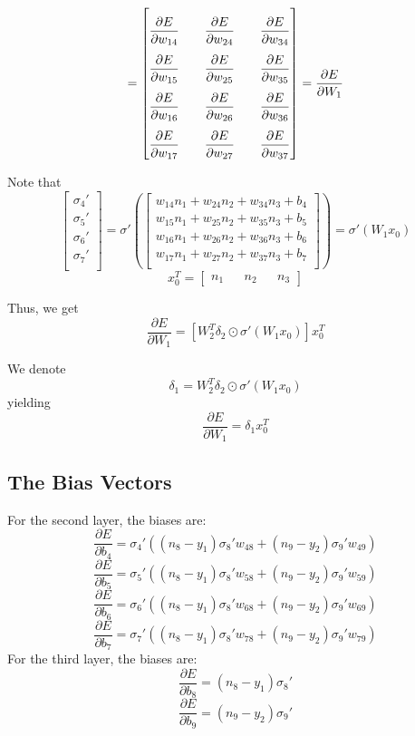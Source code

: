\documentclass{article}
\begin{document}
\[
=
\renewcommand{\arraystretch}{2.5}
\begin{bmatrix}
    \dfrac{\partial E}{\partial w_{14}} && \dfrac{\partial E}{\partial w_{24}}  && \dfrac{\partial E}{\partial w_{34}}  \\
    \dfrac{\partial E}{\partial w_{15}} && \dfrac{\partial E}{\partial w_{25}}  && \dfrac{\partial E}{\partial w_{35}}  \\
    \dfrac{\partial E}{\partial w_{16}} && \dfrac{\partial E}{\partial w_{26}}  && \dfrac{\partial E}{\partial w_{36}}  \\
    \dfrac{\partial E}{\partial w_{17}} && \dfrac{\partial E}{\partial w_{27}}  && \dfrac{\partial E}{\partial w_{37}}  \\
\end{bmatrix}
\renewcommand{\arraystretch}{1}
=
\dfrac{\partial E}{\partial W_1}
\]

Note that
\[
\begin{bmatrix}
    \sigma_4' \\
    \sigma_5' \\
    \sigma_6' \\
    \sigma_7' \\
\end{bmatrix}
 =
 \sigma'\left(
 \begin{bmatrix}
     w_{14}n_1 + w_{24}n_2 + w_{34}n_3 + b_4 \\
     w_{15}n_1 + w_{25}n_2 + w_{35}n_3 + b_5 \\
     w_{16}n_1 + w_{26}n_2 + w_{36}n_3 + b_6 \\
     w_{17}n_1 + w_{27}n_2 + w_{37}n_3 + b_7 \\
 \end{bmatrix}
 \right)
 =
 \sigma'(W_1x_0)
 \]
 \[ x_0^T = \begin{bmatrix}
    n_1 && n_2 && n_3
\end{bmatrix}
\]

Thus, we get
\[
\dfrac{\partial E}{\partial W_1} =
[W_2^T\delta_2 \odot \sigma'(W_1x_0)]x_0^T
\]

We denote
\[\delta_1 = W_2^T\delta_2 \odot \sigma'(W_1x_0)\]
yielding
\[\dfrac{\partial E}{\partial W_1} = \delta_1x_0^T\]


\subsection{The Bias Vectors}
For the second layer, the biases are:
\[\dfrac{\partial E}{\partial b_4} = \sigma_4'((n_8-y_1)\sigma_8'w_{48} + (n_9-y_2)\sigma_9'w_{49})\]
\[\dfrac{\partial E}{\partial b_5} = \sigma_5'((n_8-y_1)\sigma_8'w_{58} + (n_9-y_2)\sigma_9'w_{59})\]
\[\dfrac{\partial E}{\partial b_6} = \sigma_6'((n_8-y_1)\sigma_8'w_{68} + (n_9-y_2)\sigma_9'w_{69})\]
\[\dfrac{\partial E}{\partial b_7} = \sigma_7'((n_8-y_1)\sigma_8'w_{78} + (n_9-y_2)\sigma_9'w_{79})\]
For the third layer, the biases are:
\[\dfrac{\partial E}{\partial b_8} = (n_8-y_1)\sigma_8'\]
\[\dfrac{\partial E}{\partial b_9} = (n_9-y_2)\sigma_9'\]
\end{document}

